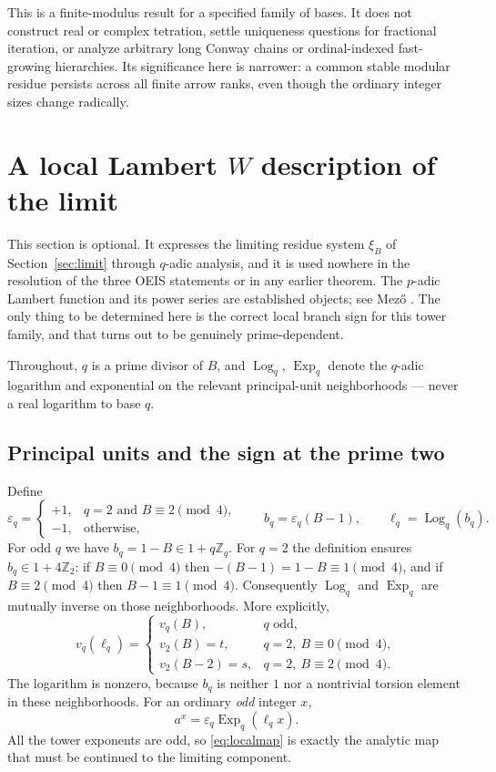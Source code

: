 \documentclass[11pt,letterpaper]{article}
\numberwithin{equation}{section}
\theoremstyle{definition}
\theoremstyle{remark}
\newcommand{\Z}{\mathbb Z}
\newcommand{\eps}{\varepsilon}
\DeclareMathOperator{\Logop}{Log}
\DeclareMathOperator{\Expop}{Exp}
\begin{document}
This is a finite-modulus result for a specified family of bases. It does not construct real or complex tetration, settle uniqueness questions for fractional iteration, or analyze arbitrary long Conway chains or ordinal-indexed fast-growing hierarchies. Its significance here is narrower: a common stable modular residue persists across all finite arrow ranks, even though the ordinary integer sizes change radically.

\section{A local Lambert \texorpdfstring{$W$}{W} description of the limit}\label{sec:lambert}

This section is optional. It expresses the limiting residue system $\xi_B$ of Section~\ref{sec:limit} through $q$-adic analysis, and it is used nowhere in the resolution of the three OEIS statements or in any earlier theorem. The $p$-adic Lambert function and its power series are established objects; see Mez\H{o} \cite{mezo}. The only thing to be determined here is the correct local branch sign for this tower family, and that turns out to be genuinely prime-dependent.

Throughout, $q$ is a prime divisor of $B$, and $\Logop_q$, $\Expop_q$ denote the $q$-adic logarithm and exponential on the relevant principal-unit neighborhoods --- never a real logarithm to base $q$.

\subsection{Principal units and the sign at the prime two}

Define
\begin{equation}\label{eq:epsilon}
 \eps_q=
 \begin{cases}
 +1,&q=2\text{ and }B\equiv2\pmod4,\\
 -1,&\text{otherwise},
 \end{cases}
 \qquad b_q=\eps_q(B-1),\qquad \ell_q=\Logop_q(b_q).
\end{equation}
For odd $q$ we have $b_q=1-B\in1+q\Z_q$. For $q=2$ the definition ensures $b_q\in1+4\Z_2$: if $B\equiv0\pmod4$ then $-(B-1)=1-B\equiv1\pmod4$, and if $B\equiv2\pmod4$ then $B-1\equiv1\pmod4$. Consequently $\Logop_q$ and $\Expop_q$ are mutually inverse on those neighborhoods. More explicitly,
\begin{equation}\label{eq:ellval}
 v_q(\ell_q)=
 \begin{cases}
 v_q(B),&q\text{ odd},\\
 v_2(B)=t,&q=2,\ B\equiv0\pmod4,\\
 v_2(B-2)=s,&q=2,\ B\equiv2\pmod4.
 \end{cases}
\end{equation}
The logarithm is nonzero, because $b_q$ is neither $1$ nor a nontrivial torsion element in these neighborhoods. For an ordinary \emph{odd} integer $x$,
\begin{equation}\label{eq:localmap}
 a^x=\eps_q\Expop_q(\ell_q x).
\end{equation}
All the tower exponents are odd, so \eqref{eq:localmap} is exactly the analytic map that must be continued to the limiting component.
\end{document}
